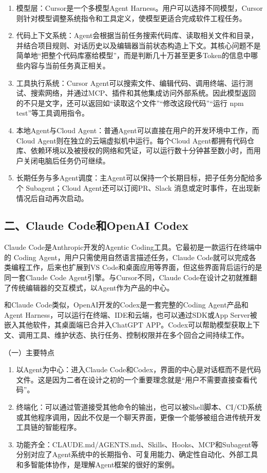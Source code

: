 \begin{enumerate}
\def\labelenumi{\arabic{enumi}.}
\item
  模型层：Cursor是一个多模型Agent Harness。用户可以选择不同模型，Cursor则针对模型调整系统指令和工具定义，使模型更适合完成软件工程任务。
\item
  代码上下文系统：Agent会根据当前任务搜索代码库、读取相关文件和目录，并结合项目规则、对话历史以及编辑器当前状态构造上下文。其核心问题不是简单地``把整个代码库塞给模型''，而是判断几十万甚至更多Token的信息中哪些内容与当前任务真正相关。
\item
  工具执行系统：Cursor Agent可以搜索文件、编辑代码、调用终端、运行测试、搜索网络，并通过MCP、插件和其他集成访问外部系统。因此模型返回的不只是文字，还可以返回如``读取这个文件''``修改这段代码''``运行 npm test''等工具调用指令。
\item
  本地Agent与Cloud Agent：普通Agent可以直接在用户的开发环境中工作，而Cloud Agent则在独立的云端虚拟机中运行。每个Cloud Agent都拥有代码仓库、依赖环境以及被授权的网络和凭证，可以运行数十分钟甚至数小时，而用户关闭电脑后任务仍可继续。
\item
  长期任务与多Agent调度：主Agent可以保持一个长期目标，把子任务分配给多个 Subagent；Cloud Agent还可以订阅PR、Slack 消息或定时事件，在出现新情况后自动再次启动。
\end{enumerate}

\hypertarget{ux4e8cclaude-codeux548copenai-codex}{%
\subsection{二、Claude Code和OpenAI Codex}\label{ux4e8cclaude-codeux548copenai-codex}}

Claude Code是Anthropic开发的Agentic Coding工具。它最初是一款运行在终端中的 Coding Agent，用户只需使用自然语言描述任务，Claude Code就可以完成各类编程工作，后来也扩展到VS Code和桌面应用等界面，但这些界面背后运行的是同一套Claude Code Agent引擎。与Cursor不同，Claude Code在设计之初就推翻了传统编辑器的交互模式，以Agent作为产品的中心。

和Claude Code类似，OpenAI开发的Codex是一套完整的Coding Agent产品和Agent Harness，可以运行在终端、IDE和云端，也可以通过SDK或App Server被嵌入其他软件，其桌面端已合并入ChatGPT APP。Codex可以帮助模型获取上下文、调用工具、维护状态、执行任务、控制权限并在多个回合之间持续工作。

（一）主要特点

\begin{enumerate}
\def\labelenumi{\arabic{enumi}.}
\item
  以Agent为中心：进入Claude Code和Codex，界面的中心是对话框而不是代码文件。这是因为二者在设计之初的一个重要理念就是``用户不需要直接查看代码''。
\item
  终端化：可以通过管道接受其他命令的输出，也可以被Shell脚本、CI/CD系统或其他程序调用，因此不仅是一个聊天界面，更像一个能够被组合进传统开发工具链的智能程序。
\item
  功能齐全：CLAUDE.md/AGENTS.md、Skills、Hooks、MCP和Subagent等分别对应了Agent系统中的长期指令、可复用能力、确定性自动化、外部工具和多智能体协作，是理解Agent框架的很好的案例。
\end{enumerate}

